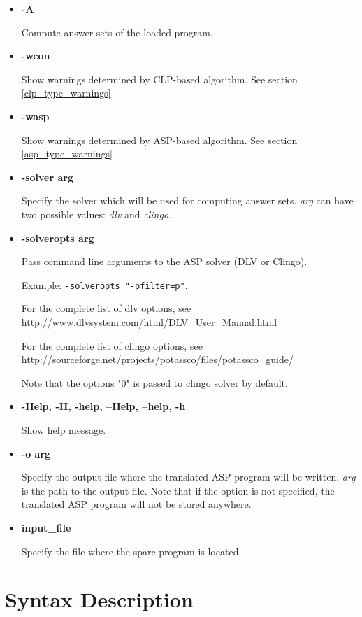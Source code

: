 \documentclass[12pt, letterpaper]{article}
\begin{document}
\begin{itemize}
 \item \textbf{-A}
    
  Compute answer sets of the loaded program.

\item \textbf{-wcon}
    
  Show warnings determined by CLP-based algorithm. See section \ref{clp_type_warnings}

\item \textbf{-wasp}
    
  Show warnings determined by ASP-based algorithm. See section \ref{asp_type_warnings}

\item \textbf{-solver arg}

  Specify the solver which will be used for computing answer sets. \textit{arg} can have two possible values: \textit{dlv} and \textit{clingo}. 
\item \textbf{-solveropts arg}

  Pass command line arguments to the ASP solver (DLV or Clingo).
  
  Example: \texttt{-solveropts "-pfilter=p"}.


  For the complete list of dlv options, see 
  \url{http://www.dlvsystem.com/html/DLV_User_Manual.html }


  For the complete list of clingo options, see 
  \url{http://sourceforge.net/projects/potassco/files/potassco_guide/}

  Note that the options "0"  is passed to clingo solver by default.

\item \textbf{-Help, -H, -help, --Help, --help, -h}

  Show help message.

\item \textbf{-o arg}

  Specify the output file where the translated ASP program will be written. \textit{arg} is the path to the output file. 
  Note that if the option is not specified, the translated ASP program will not be stored anywhere.

\item \textbf{input\_file}
  
Specify the file where the sparc program is located.



\end{itemize}


\section{Syntax Description}
\end{document}
